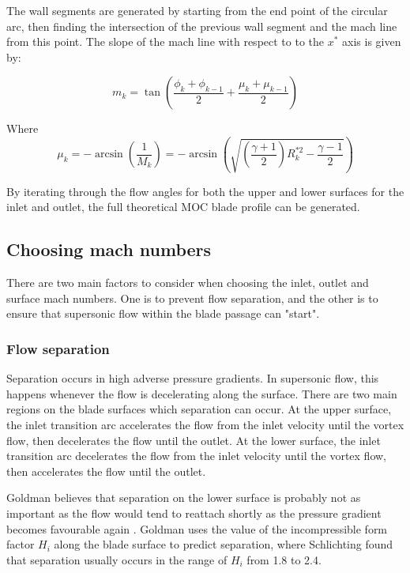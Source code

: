 The wall segments are generated by starting from the end point of the circular arc, then finding the intersection of the previous wall segment and the mach line from this point. The slope of the mach line with respect to to the $x^*$ axis is given by:

\begin{equation}
    m_k = \tan\left(\frac{\phi_k+\phi_{k-1}}{2}+\frac{\mu_k+\mu_{k-1}}{2}\right)
\end{equation}

Where
\begin{equation}
    \mu_k = -\arcsin\left(\frac{1}{M_k}\right) = -\arcsin\left(\sqrt{\left(\frac{\gamma+1}{2}\right)R^{*2}_k - \frac{\gamma-1}{2}}\right)
\end{equation}

By iterating through the flow angles for both the upper and lower surfaces for the inlet and outlet, the full theoretical MOC blade profile can be generated.


\subsection{Choosing mach numbers}

There are two main factors to consider when choosing the inlet, outlet and surface mach numbers. One is to prevent flow separation, and the other is to ensure that supersonic flow within the blade passage can "start".

\subsubsection{Flow separation}

Separation occurs in high adverse pressure gradients. In supersonic flow, this happens whenever the flow is decelerating along the surface.  There are two main regions on the blade surfaces which separation can occur. At the upper surface, the inlet transition arc accelerates the flow from the inlet velocity until the vortex flow, then decelerates the flow until the outlet. At the lower surface, the inlet transition arc decelerates the flow from the inlet velocity until the vortex flow, then accelerates the flow until the outlet. 

Goldman believes that separation on the lower surface is probably not as important as the flow would tend to reattach shortly as the pressure gradient becomes favourable again \cite{goldman 1970}. Goldman uses the value of the incompressible form factor $H_i$ along the blade surface to predict separation, where  Schlichting found  that separation usually occurs in the range of $H_i$ from 1.8 to 2.4.

